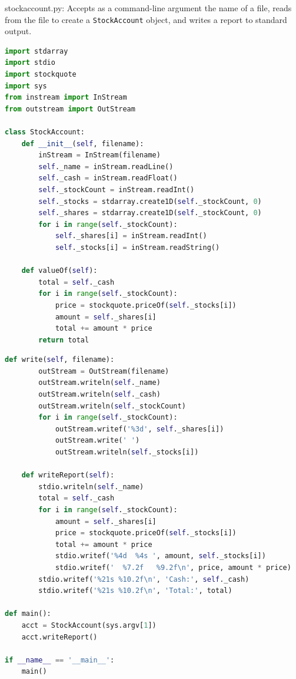 \documentclass[8pt,a4paper,compress,handout]{beamer}
\begin{document}
\begin{frame}[fragile]
\begin{framed}
\tiny stockaccount.py: Accepts as a command-line argument the name of a file, reads from the file to create a \lstinline{StockAccount} object, and writes a report to standard output.
\end{framed}

\begin{lstlisting}[language=Python]
import stdarray
import stdio
import stockquote
import sys
from instream import InStream
from outstream import OutStream

class StockAccount:
    def __init__(self, filename):
        inStream = InStream(filename)
        self._name = inStream.readLine()
        self._cash = inStream.readFloat()
        self._stockCount = inStream.readInt()
        self._stocks = stdarray.create1D(self._stockCount, 0)
        self._shares = stdarray.create1D(self._stockCount, 0)
        for i in range(self._stockCount):
            self._shares[i] = inStream.readInt()
            self._stocks[i] = inStream.readString()

    def valueOf(self):
        total = self._cash
        for i in range(self._stockCount):
            price = stockquote.priceOf(self._stocks[i])
            amount = self._shares[i]
            total += amount * price
        return total
\end{lstlisting}
\end{frame}

\begin{frame}[fragile]
\begin{lstlisting}[language=Python]
    def write(self, filename):
        outStream = OutStream(filename)
        outStream.writeln(self._name)
        outStream.writeln(self._cash)
        outStream.writeln(self._stockCount)
        for i in range(self._stockCount):
            outStream.writef('%3d', self._shares[i])
            outStream.write(' ')
            outStream.writeln(self._stocks[i])

    def writeReport(self):
        stdio.writeln(self._name)
        total = self._cash
        for i in range(self._stockCount):
            amount = self._shares[i]
            price = stockquote.priceOf(self._stocks[i])
            total += amount * price
            stdio.writef('%4d  %4s ', amount, self._stocks[i])
            stdio.writef('  %7.2f   %9.2f\n', price, amount * price)
        stdio.writef('%21s %10.2f\n', 'Cash:', self._cash)
        stdio.writef('%21s %10.2f\n', 'Total:', total)

def main():
    acct = StockAccount(sys.argv[1])
    acct.writeReport()

if __name__ == '__main__':
    main()
\end{lstlisting}
\end{frame}
\end{document}
